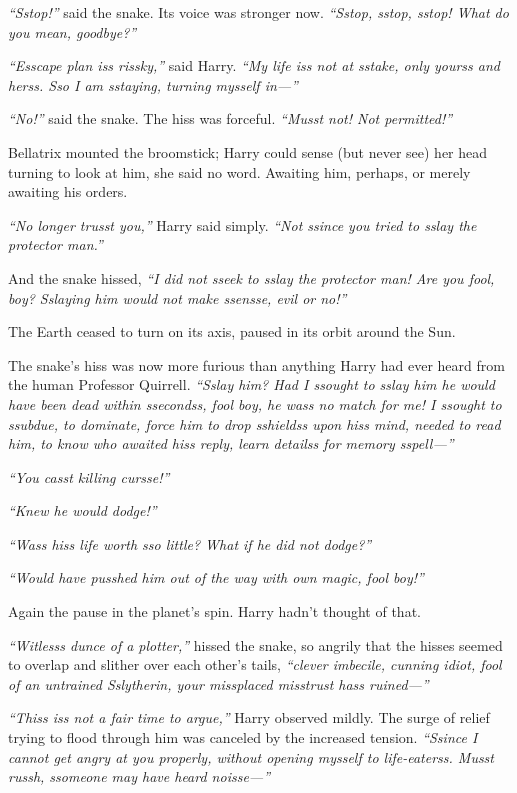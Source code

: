 \emph{``Sstop!''} said the snake. Its voice was stronger now.
\emph{``Sstop, sstop, sstop! What do you mean, goodbye?''}

\emph{``Esscape plan iss rissky,''} said Harry. \emph{``My life iss not
at sstake, only yourss and herss. Sso I am sstaying, turning mysself
in---''}

\emph{``No!''} said the snake. The hiss was forceful. \emph{``Musst not!
Not permitted!''}

Bellatrix mounted the broomstick; Harry could sense (but never see) her
head turning to look at him, she said no word. Awaiting him, perhaps, or
merely awaiting his orders.

\emph{``No longer trusst you,''} Harry said simply. \emph{``Not ssince
you tried to sslay the protector man.''}

And the snake hissed, \emph{``I did not sseek to sslay the protector
man! Are you fool, boy? Sslaying him would not make ssensse, evil or
no!''}

The Earth ceased to turn on its axis, paused in its orbit around the
Sun.

The snake's hiss was now more furious than anything Harry had ever heard
from the human Professor Quirrell. \emph{``Sslay him? Had I ssought to
sslay him he would have been dead within ssecondss, fool boy, he wass no
match for me! I ssought to ssubdue, to dominate, force him to drop
sshieldss upon hiss mind, needed to read him, to know who awaited hiss
reply, learn detailss for memory sspell---''}

\emph{``You casst killing cursse!''}

\emph{``Knew he would dodge!''}

\emph{``Wass hiss life worth sso little? What if he did not dodge?''}

\emph{``Would have pusshed him out of the way with own magic, fool
boy!''}

Again the pause in the planet's spin. Harry hadn't thought of that.

\emph{``Witlesss dunce of a plotter,''} hissed the snake, so angrily
that the hisses seemed to overlap and slither over each other's tails,
\emph{``clever imbecile, cunning idiot, fool of an untrained Sslytherin,
your missplaced misstrust hass ruined---''}

\emph{``Thiss iss not a fair time to argue,''} Harry observed mildly.
The surge of relief trying to flood through him was canceled by the
increased tension. \emph{``Ssince I cannot get angry at you properly,
without opening mysself to life-eaterss. Musst russh, ssomeone may have
heard noisse---''}

